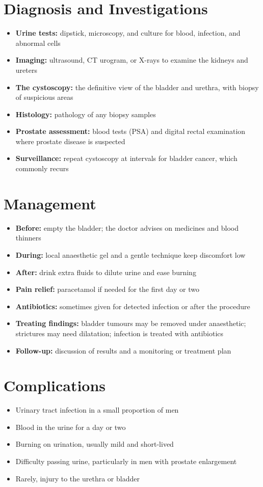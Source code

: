 \section*{Diagnosis and Investigations}
\begin{itemize}
    \item \textbf{Urine tests:} dipstick, microscopy, and culture for blood, infection, and abnormal cells
    \item \textbf{Imaging:} ultrasound, CT urogram, or X-rays to examine the kidneys and ureters
    \item \textbf{The cystoscopy:} the definitive view of the bladder and urethra, with biopsy of suspicious areas
    \item \textbf{Histology:} pathology of any biopsy samples
    \item \textbf{Prostate assessment:} blood tests (PSA) and digital rectal examination where prostate disease is suspected
    \item \textbf{Surveillance:} repeat cystoscopy at intervals for bladder cancer, which commonly recurs
\end{itemize}

\section*{Management}
\begin{itemize}
    \item \textbf{Before:} empty the bladder; the doctor advises on medicines and blood thinners
    \item \textbf{During:} local anaesthetic gel and a gentle technique keep discomfort low
    \item \textbf{After:} drink extra fluids to dilute urine and ease burning
    \item \textbf{Pain relief:} paracetamol if needed for the first day or two
    \item \textbf{Antibiotics:} sometimes given for detected infection or after the procedure
    \item \textbf{Treating findings:} bladder tumours may be removed under anaesthetic; strictures may need dilatation; infection is treated with antibiotics
    \item \textbf{Follow-up:} discussion of results and a monitoring or treatment plan
\end{itemize}

\section*{Complications}
\begin{itemize}
    \item Urinary tract infection in a small proportion of men
    \item Blood in the urine for a day or two
    \item Burning on urination, usually mild and short-lived
    \item Difficulty passing urine, particularly in men with prostate enlargement
    \item Rarely, injury to the urethra or bladder
\end{itemize}


